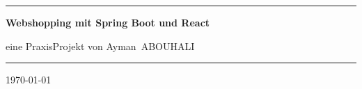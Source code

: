 {\begin{titlepage}

      \vspace{160pt}%
      \rule{\textwidth}{2pt}

      \begin{center}
          \Huge \textsf{\bfseries Webshopping mit Spring Boot und React}

          \vspace{20pt}%
          \Large  eine PraxisProjekt von Ayman~ABOUHALI
      \end{center}

      \rule{\textwidth}{2pt}

      \vspace{15pt}
      \begin{center}
          \today
      \end{center}

  \end{titlepage}
}
\makeatother
